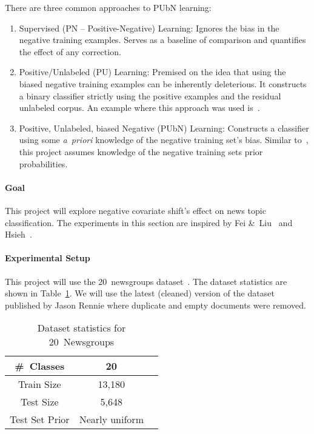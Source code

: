 \documentclass[10pt]{article}
\begin{document}
  There are three common approaches to PUbN learning:

  \begin{enumerate}
    \item Supervised (PN -- Positive-Negative) Learning: Ignores the bias in the negative training examples.  Serves as a baseline of comparison and quantifies the effect of any correction.

    \item Positive\-/Unlabeled (PU) Learning: Premised on the idea that using the biased negative training examples can be inherently deleterious.  It constructs a binary classifier strictly using the positive examples and the residual unlabeled corpus.  An example where this approach was used is~\cite{Li:2010}.

    \item Positive, Unlabeled, biased Negative (PUbN) Learning: Constructs a classifier using some \textit{a~priori} knowledge of the negative training set's bias.  Similar to~\cite{Hsieh:2019}, this project assumes knowledge of the negative training sets prior probabilities.
  \end{enumerate}

  \paragraph{Goal} This project will explore negative covariate shift's effect on news topic classification.  The experiments in this section are inspired by Fei \&~Liu~\cite{Fei:2015} and Hsieh\etal~\cite{Hsieh:2019}.

  \paragraph{Experimental Setup} This project will use the 20~newsgroups dataset~\cite{20Newsgroups}.  The dataset statistics are shown in Table~\ref{tab:DatasetComparison}.  We will use the latest (cleaned) version of the dataset published by Jason Rennie where duplicate and empty documents were removed.

  \begin{table}[b]
    \centering
    \caption{Dataset statistics for 20~Newsgroups}\label{tab:DatasetComparison}
    \begin{tabular}{|c|c|c|}
      \hline
      \#~Classes     & 20                     \\\hline
      Train Size     & 13,180                 \\\hline
      Test Size      & 5,648                  \\\hline
      Test Set Prior & Nearly uniform         \\\hline
    \end{tabular}
  \end{table}
\end{document}
